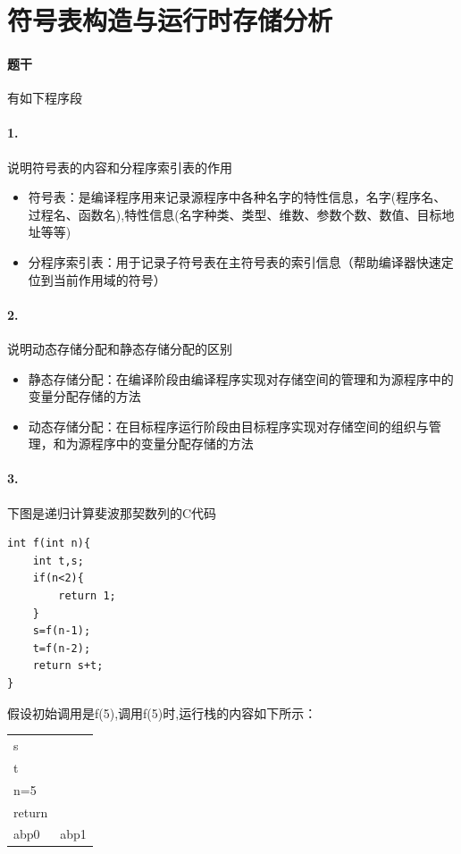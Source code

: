 \documentclass[UTF8]{ctexart} %
\begin{document}
\section{符号表构造与运行时存储分析}

\paragraph{题干} 有如下程序段

\paragraph{1.} 说明符号表的内容和分程序索引表的作用

\begin{itemize}
    \item 符号表：是编译程序用来记录源程序中各种名字的特性信息，名字(程序名、过程名、函数名),特性信息(名字种类、类型、维数、参数个数、数值、目标地址等等)
    \item 分程序索引表：用于记录子符号表在主符号表的索引信息（帮助编译器快速定位到当前作用域的符号）
\end{itemize}

\paragraph{2.} 说明动态存储分配和静态存储分配的区别

\begin{itemize}
    \item 静态存储分配：在编译阶段由编译程序实现对存储空间的管理和为源程序中的变量分配存储的方法
    \item 动态存储分配：在目标程序运行阶段由目标程序实现对存储空间的组织与管理，和为源程序中的变量分配存储的方法
\end{itemize}

\paragraph{3.} 下图是递归计算斐波那契数列的C代码

\begin{lstlisting}
int f(int n){
    int t,s;
    if(n<2){
        return 1;
    }
    s=f(n-1);
    t=f(n-2);
    return s+t;
}
\end{lstlisting}

假设初始调用是f(5),调用f(5)时,运行栈的内容如下所示：

\begin{table}[H]
    \centering
    \begin{tabular}{|p{3cm}<{\centering}|p{2cm}<{\centering}|}
        \hline
               &      \\
        \hline
        s      &      \\
        \hline
        t      &      \\
        \hline
        n=5    &      \\
        \hline
        return &      \\
        \hline
        abp0   & abp1 \\
        \hline
    \end{tabular}
\end{table}
\end{document}

